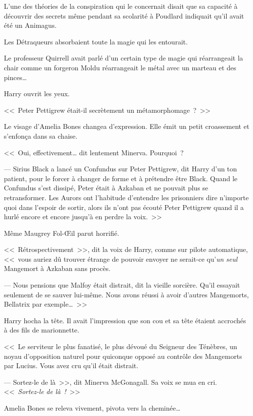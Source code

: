 L'une des théories de la conspiration qui le concernait disait que sa capacité à découvrir des secrets même pendant sa scolarité à Poudlard indiquait qu'il avait été un Animagus.

Les Détraqueurs absorbaient toute la magie qui les entourait.

Le professeur Quirrell avait parlé d'un certain type de magie qui réarrangeait la chair comme un forgeron Moldu réarrangeait le métal avec un marteau et des pinces…

Harry ouvrit les yeux.

<<~Peter Pettigrew était-il secrètement un métamorphomage~?~>>

Le visage d'Amelia Bones changea d'expression. Elle émit un petit croassement et s'enfonça dans sa chaise.

<<~Oui, effectivement… dit lentement Minerva. Pourquoi~?

--- Sirius Black a lancé un Confundus sur Peter Pettigrew, dit Harry d'un ton patient, pour le forcer à changer de forme et à prétendre être Black. Quand le Confundus s'est dissipé, Peter était à Azkaban et ne pouvait plus se retransformer. Les Aurors ont l'habitude d'entendre les prisonniers dire n'importe quoi dans l'espoir de sortir, alors ils n'ont pas écouté Peter Pettigrew quand il a hurlé encore et encore jusqu'à en perdre la voix.~>>

Même Maugrey Fol-Œil parut horrifié.

<<~Rétrospectivement~>>, dit la voix de Harry, comme sur pilote automatique, <<~vous auriez dû trouver étrange de pouvoir envoyer ne serait-ce qu'\emph{un seul} Mangemort à Azkaban sans procès.

--- Nous pensions que Malfoy était distrait, dit la vieille sorcière. Qu'il essayait seulement de se sauver lui-même. Nous avons réussi à avoir d'autres Mangemorts, Bellatrix par exemple…~>>

Harry hocha la tête. Il avait l'impression que son cou et sa tête étaient accrochés à des fils de marionnette.

<<~Le serviteur le plus fanatisé, le plus dévoué du Seigneur des Ténèbres, un noyau d'opposition naturel pour quiconque opposé au contrôle des Mangemorts par Lucius. Vous avez cru qu'il était distrait.

--- Sortez-le de là~>>, dit Minerva McGonagall. Sa voix se mua en cri. <<~\emph{Sortez-le de là~!}~>>

Amelia Bones se releva vivement, pivota vers la cheminée…

